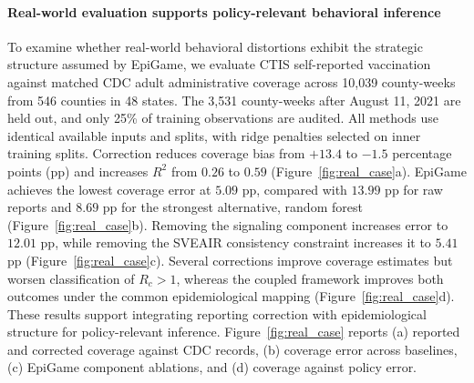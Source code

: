 \documentclass[sigconf,review]{acmart}
\newcommand{\model}{EpiGame}
\begin{document}
\paragraph{Real-world evaluation supports policy-relevant behavioral inference}
To examine whether real-world behavioral distortions exhibit the strategic structure assumed by \model{}, we evaluate CTIS self-reported vaccination against matched CDC adult administrative coverage across 10,039 county-weeks from 546 counties in 48 states. The 3,531 county-weeks after August 11, 2021 are held out, and only 25\% of training observations are audited. All methods use identical available inputs and splits, with ridge penalties selected on inner training splits. Correction reduces coverage bias from $+13.4$ to $-1.5$ percentage points (pp) and increases $R^2$ from $0.26$ to $0.59$ (Figure~\ref{fig:real_case}a). \model{} achieves the lowest coverage error at $5.09$ pp, compared with $13.99$ pp for raw reports and $8.69$ pp for the strongest alternative, random forest (Figure~\ref{fig:real_case}b). Removing the signaling component increases error to $12.01$ pp, while removing the SVEAIR consistency constraint increases it to $5.41$ pp (Figure~\ref{fig:real_case}c). Several corrections improve coverage estimates but worsen classification of $R_c>1$, whereas the coupled framework improves both outcomes under the common epidemiological mapping (Figure~\ref{fig:real_case}d). These results support integrating reporting correction with epidemiological structure for policy-relevant inference.  Figure~\ref{fig:real_case} reports (a) reported and corrected coverage against CDC records, (b) coverage error across baselines, (c) \model{} component ablations, and (d) coverage against policy error.
\end{document}
